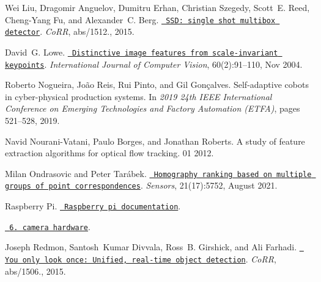 \begin{DoxyDescription}
\item[\label{citelist_CITEREF_wei15}%
\Hypertarget{citelist_CITEREF_wei15}%
\mbox{[}15\mbox{]}]Wei Liu, Dragomir Anguelov, Dumitru Erhan, Christian Szegedy, Scott~E. Reed, Cheng-\/\+Yang Fu, and Alexander~C. Berg. \href{http://arxiv.org/abs/1512.02325}{\texttt{ SSD\+: single shot multibox detector}}. {\itshape Co\+RR}, abs/1512., 2015.


\item[\label{citelist_CITEREF_lowe2004}%
\Hypertarget{citelist_CITEREF_lowe2004}%
\mbox{[}16\mbox{]}]David~G. Lowe. \href{https://doi.org/10.1023/B:VISI.0000029664.99615.94}{\texttt{ Distinctive image features from scale-\/invariant keypoints}}. {\itshape International Journal of Computer Vision}, 60(2)\+:91--110, Nov 2004. 


\item[\label{citelist_CITEREF_Nogueira19}%
\Hypertarget{citelist_CITEREF_Nogueira19}%
\mbox{[}17\mbox{]}]Roberto Nogueira, João Reis, Rui Pinto, and Gil Gonçalves. Self-\/adaptive cobots in cyber-\/physical production systems. In {\itshape 2019 24th IEEE International Conference on Emerging Technologies and Factory Automation (ETFA)}, pages 521--528, 2019. 


\item[\label{citelist_CITEREF_Nourani12}%
\Hypertarget{citelist_CITEREF_Nourani12}%
\mbox{[}18\mbox{]}]Navid Nourani-\/\+Vatani, Paulo Borges, and Jonathan Roberts. A study of feature extraction algorithms for optical flow tracking. 01 2012.


\item[\label{citelist_CITEREF_Ondraovi21}%
\Hypertarget{citelist_CITEREF_Ondraovi21}%
\mbox{[}19\mbox{]}]Milan Ondrasovic and Peter Tar\'{a}bek. \href{https://doi.org/10.3390/s21175752}{\texttt{ Homography ranking based on multiple groups of point correspondences}}. {\itshape Sensors}, 21(17)\+:5752, August 2021. 


\item[\label{citelist_CITEREF_pi}%
\Hypertarget{citelist_CITEREF_pi}%
\mbox{[}20\mbox{]}]Raspberry Pi. \href{https://www.raspberrypi.com/documentation/accessories/camera.html}{\texttt{ Raspberry pi documentation}}.


\item[\label{citelist_CITEREF_picamDoc}%
\Hypertarget{citelist_CITEREF_picamDoc}%
\mbox{[}21\mbox{]}]\href{https://picamera.readthedocs.io/en/release-1.13/fov.html}{\texttt{ 6. camera hardware}}.


\item[\label{citelist_CITEREF_joseph15}%
\Hypertarget{citelist_CITEREF_joseph15}%
\mbox{[}22\mbox{]}]Joseph Redmon, Santosh~Kumar Divvala, Ross~B. Girshick, and Ali Farhadi. \href{http://arxiv.org/abs/1506.02640}{\texttt{ You only look once\+: Unified, real-\/time object detection}}. {\itshape Co\+RR}, abs/1506., 2015.



\end{DoxyDescription}
